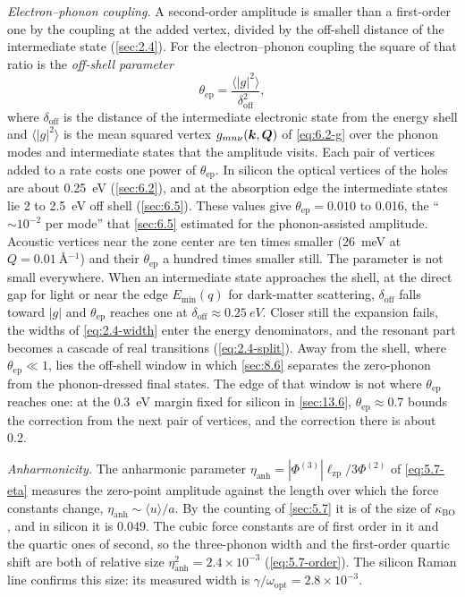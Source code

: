 \emph{Electron--phonon coupling.} A second-order amplitude is smaller than a first-order one by the coupling at the added vertex, divided by the off-shell distance of the intermediate state (\cref{sec:2.4}). For the electron--phonon coupling the square of that ratio is the \emph{off-shell parameter}
\begin{equation}
  \theta_{\mathrm{ep}} = \frac{\langle|g|^2\rangle}{\delta_{\mathrm{off}}^2} ,
  \label{eq:8.5-theta}
\end{equation}
where $\delta_{\mathrm{off}}$ is the distance of the intermediate electronic state from the energy shell and $\langle|g|^2\rangle$ is the mean squared vertex $g_{mn\nu}(\bm{k},\bm{Q})$ of \cref{eq:6.2-g} over the phonon modes and intermediate states that the amplitude visits. Each pair of vertices added to a rate costs one power of $\theta_{\mathrm{ep}}$. In silicon the optical vertices of the holes are about \SI{0.25}{eV} (\cref{sec:6.2}), and at the absorption edge the intermediate states lie 2 to \SI{2.5}{eV} off shell (\cref{sec:6.5}). These values give $\theta_{\mathrm{ep}} = 0.010$ to 0.016, the ``$\sim10^{-2}$ per mode'' that \cref{sec:6.5} estimated for the phonon-assisted amplitude. Acoustic vertices near the zone center are ten times smaller (\SI{26}{meV} at $Q = \SI{0.01}{\angstrom^{-1}}$) and their $\theta_{\mathrm{ep}}$ a hundred times smaller still. The parameter is not small everywhere. When an intermediate state approaches the shell, at the direct gap for light or near the edge $E_{\mathrm{min}}(q)$ for dark-matter scattering, $\delta_{\mathrm{off}}$ falls toward $|g|$ and $\theta_{\mathrm{ep}}$ reaches one at $\delta_{\mathrm{off}} \approx \SI{0.25}{eV}$. Closer still the expansion fails, the widths of \cref{eq:2.4-width} enter the energy denominators, and the resonant part becomes a cascade of real transitions (\cref{eq:2.4-split}). Away from the shell, where $\theta_{\mathrm{ep}} \ll 1$, lies the off-shell window in which \cref{sec:8.6} separates the zero-phonon from the phonon-dressed final states. The edge of that window is not where $\theta_{\mathrm{ep}}$ reaches one: at the \SI{0.3}{eV} margin fixed for silicon in \cref{sec:13.6}, $\theta_{\mathrm{ep}} \approx 0.7$ bounds the correction from the next pair of vertices, and the correction there is about 0.2.

\emph{Anharmonicity.} The anharmonic parameter $\eta_{\mathrm{anh}} = |\Phi^{(3)}|\ell_{\mathrm{zp}}/3\Phi^{(2)}$ of \cref{eq:5.7-eta} measures the zero-point amplitude against the length over which the force constants change, $\eta_{\mathrm{anh}} \sim \langle u\rangle/a$. By the counting of \cref{sec:5.7} it is of the size of $\kappa_{\mathrm{BO}}$, and in silicon it is 0.049. The cubic force constants are of first order in it and the quartic ones of second, so the three-phonon width and the first-order quartic shift are both of relative size $\eta_{\mathrm{anh}}^2 = 2.4\times10^{-3}$ (\cref{eq:5.7-order}). The silicon Raman line confirms this size: its measured width is $\gamma/\omega_{\mathrm{opt}} = 2.8\times10^{-3}$.

